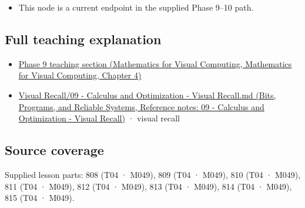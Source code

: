 \begin{itemize}
\tightlist
\item
  This node is a current endpoint in the supplied Phase 9--10 path.
\end{itemize}

\subsection{Full teaching explanation}\label{appendix-d9f70bdfbc92-full-teaching-explanation}

\begin{itemize}
\tightlist
\item
  \href{../02-Mathematics-for-Visual-Computing/main.pdf\#nameddest=01-foundations-i-ch020-functions-limits-continuity-and-scalar-change}{Phase 9 teaching section (Mathematics for Visual Computing, Mathematics for Visual Computing, Chapter 4)}
\item
  \href{../01-Bits-Programs-and-Reliable-Systems/main.pdf\#nameddest=appendix-adf48f5dc5c1}{Visual Recall/09 - Calculus and Optimization - Visual Recall.md (Bits, Programs, and Reliable Systems, Reference notes: 09 - Calculus and Optimization - Visual Recall)} · visual recall
\end{itemize}

\subsection{Source coverage}\label{appendix-d9f70bdfbc92-source-coverage}

Supplied lesson parts: 808 (T04 · M049), 809 (T04 · M049), 810 (T04 · M049), 811 (T04 · M049), 812 (T04 · M049), 813 (T04 · M049), 814 (T04 · M049), 815 (T04 · M049).
